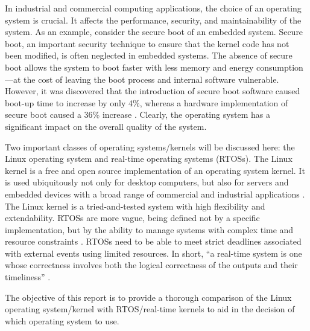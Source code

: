     In industrial and commercial computing applications, the choice of an
        operating system is crucial.
    It affects the performance, security, and maintainability of the system.
    As an example, consider the secure boot of an embedded system.
    Secure boot, an important security technique to ensure that the kernel code
        has not been modified, is often neglected in embedded systems.
    The absence of secure boot allows the system to boot faster with less memory
        and energy consumption---at the cost of leaving the boot process and
        internal software vulnerable.
    However, it was discovered that the introduction of secure boot software
        caused boot-up time to increase by only 4\%, whereas a hardware
        implementation of secure boot caused a 36\% increase
        \cite[pp. 11-12]{ingelhag}.
    Clearly, the operating system has a significant impact on the overall
        quality of the system.

    Two important classes of operating systems/kernels will be discussed
        here: the Linux operating system and real-time operating systems (RTOSs).
    The Linux kernel is a free and open source implementation of an operating
        system kernel.
    It is used ubiquitously not only for desktop computers, but also for servers
        and embedded devices with a broad range of commercial and
        industrial applications \cite{whatislinux}.
    The Linux kernel is a tried-and-tested system with high flexibility and
        extendability.
    RTOSs are more vague, being defined not by a specific implementation, but by
        the ability to manage systems with complex time and resource
        constraints \cite{rtos-overview}.
    RTOSs need to be able to meet strict deadlines associated with external
        events using limited resources.
    In short, ``a real-time system is one whose correctness involves both the
        logical correctness of the outputs and their timeliness''
        \cite{laplante}.

    The objective of this report is to provide a thorough comparison of the
        Linux operating system/kernel with RTOS/real-time kernels to aid in the
        decision of which operating system to use.
